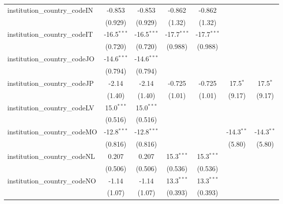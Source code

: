 \begin{tabular}{lcccccc}
   institution\_country\_codeIN          & -0.853        & -0.853        & -0.862        & -0.862        &               &   \\   
                                         & (0.929)       & (0.929)       & (1.32)        & (1.32)        &               &   \\   
   institution\_country\_codeIT          & -16.5$^{***}$ & -16.5$^{***}$ & -17.7$^{***}$ & -17.7$^{***}$ &               &   \\   
                                         & (0.720)       & (0.720)       & (0.988)       & (0.988)       &               &   \\   
   institution\_country\_codeJO          & -14.6$^{***}$ & -14.6$^{***}$ &               &               &               &   \\   
                                         & (0.794)       & (0.794)       &               &               &               &   \\   
   institution\_country\_codeJP          & -2.14         & -2.14         & -0.725        & -0.725        & 17.5$^{*}$    & 17.5$^{*}$\\   
                                         & (1.40)        & (1.40)        & (1.01)        & (1.01)        & (9.17)        & (9.17)\\   
   institution\_country\_codeLV          & 15.0$^{***}$  & 15.0$^{***}$  &               &               &               &   \\   
                                         & (0.516)       & (0.516)       &               &               &               &   \\   
   institution\_country\_codeMO          & -12.8$^{***}$ & -12.8$^{***}$ &               &               & -14.3$^{**}$  & -14.3$^{**}$\\   
                                         & (0.816)       & (0.816)       &               &               & (5.80)        & (5.80)\\   
   institution\_country\_codeNL          & 0.207         & 0.207         & 15.3$^{***}$  & 15.3$^{***}$  &               &   \\   
                                         & (0.506)       & (0.506)       & (0.536)       & (0.536)       &               &   \\   
   institution\_country\_codeNO          & -1.14         & -1.14         & 13.3$^{***}$  & 13.3$^{***}$  &               &   \\   
                                         & (1.07)        & (1.07)        & (0.393)       & (0.393)       &               &   \\   

\end{tabular}
